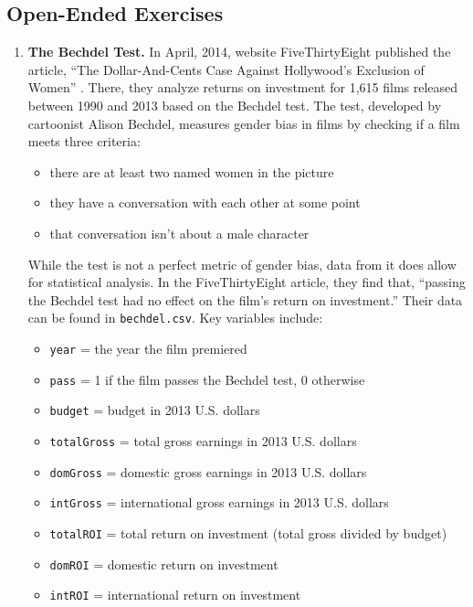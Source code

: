 \documentclass[
]{krantz}
\providecommand{\tightlist}{%
  \setlength{\itemsep}{0pt}\setlength{\parskip}{0pt}}
\begin{document}
\subsection{Open-Ended Exercises}\label{open-ended-exercises}

\begin{enumerate}
\def\labelenumi{\arabic{enumi}.}
\item
  \textbf{The Bechdel Test.} In April, 2014, website FiveThirtyEight published the article, ``The Dollar-And-Cents Case Against Hollywood's Exclusion of Women'' \citep{Hickey2014}. There, they analyze returns on investment for 1,615 films released between 1990 and 2013 based on the Bechdel test. The test, developed by cartoonist Alison Bechdel, measures gender bias in films by checking if a film meets three criteria:

  \begin{itemize}
  \tightlist
  \item
    there are at least two named women in the picture
  \item
    they have a conversation with each other at some point
  \item
    that conversation isn't about a male character
  \end{itemize}

  While the test is not a perfect metric of gender bias, data from it does allow for statistical analysis. In the FiveThirtyEight article, they find that, ``passing the Bechdel test had no effect on the film's return on investment.'' Their data can be found in \texttt{bechdel.csv}. Key variables include:

  \begin{itemize}
  \tightlist
  \item
    \texttt{year} = the year the film premiered
  \item
    \texttt{pass} = 1 if the film passes the Bechdel test, 0 otherwise
  \item
    \texttt{budget} = budget in 2013 U.S. dollars
  \item
    \texttt{totalGross} = total gross earnings in 2013 U.S. dollars
  \item
    \texttt{domGross} = domestic gross earnings in 2013 U.S. dollars
  \item
    \texttt{intGross} = international gross earnings in 2013 U.S. dollars
  \item
    \texttt{totalROI} = total return on investment (total gross divided by budget)
  \item
    \texttt{domROI} = domestic return on investment
  \item
    \texttt{intROI} = international return on investment
  \end{itemize}


\end{enumerate}
\end{document}
